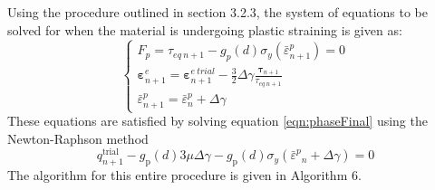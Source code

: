 \documentclass[sn-mathphys,Numbered,draft]{sn-jnl}%
\begin{document}
Using the procedure outlined in section 3.2.3, the system of equations to be solved for when the material is undergoing plastic straining is given as: 
\begin{equation}
\left\{\begin{array}{c}
F_p=\tau_{eq\ n+1}-g_p(d)\sigma_y\left(\bar{\varepsilon}^p_{n+1}\right)=0 \\
\boldsymbol{\varepsilon}_{n+1}^e=\boldsymbol{\varepsilon}_{n+1}^{e\ trial}-\frac{3}{2} \Delta \gamma \frac{\boldsymbol{\tau}_{n+1}}{\tau_{eq\ n+1}} \\
\bar{\varepsilon}^p_{n+1}=\bar{\varepsilon}^p_n+\Delta \gamma
\end{array}\right.
\end{equation}
These equations are satisfied by solving equation \ref{eqn:phaseFinal} using the Newton-Raphson method
\begin{equation}
\label{eqn:phaseFinal}
q_{n+1}^{\text {trial }}-g_{\mathrm{p}}(d) 3 \mu \Delta \gamma-g_{\mathrm{p}}(d) \sigma_y\left(\bar{\varepsilon}^p{ }_n+\Delta \gamma\right)=0
\end{equation}
The algorithm for this entire procedure is given in Algorithm 6.
\end{document}
